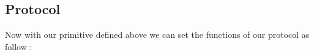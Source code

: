 \subsection{Protocol}
Now with our primitive defined above we can set the functions of our protocol as follow : \\







